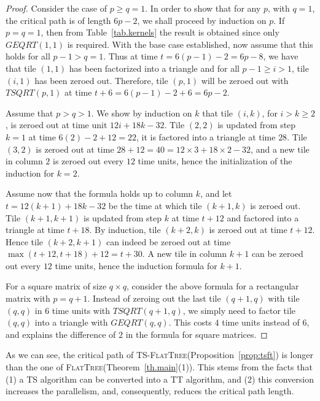 \documentclass[a4paper,twopages]{article}
\newcommand{\GEQRT}{\ensuremath{\mathit{GEQRT}}\xspace}
\newcommand{\TSQRT}{\ensuremath{\mathit{TSQRT}}\xspace}
\newcommand{\TSFT}{\textsc{TS-FlatTree}\xspace}
\newcommand{\FT}{\textsc{FlatTree}\xspace}
\begin{document}
\begin{proof}
    Consider the case of $p \geq q = 1$. In order to show that for any $p$,
    with $q=1$, the critical path is of length $6p-2$, we shall proceed by
    induction on $p$.  If $p=q=1$, then from Table~\ref{tab.kernels} the result
    is obtained since only $\GEQRT(1,1)$ is required.  With the base case
    established, now assume that this holds for all $p-1 > q = 1$.  Thus at
    time $t=6(p-1) -2 = 6p - 8$, we have that tile $(1,1)$ has been factorized
    into a triangle and for all $p-1 \geq i > 1$, tile $(i,1)$ has been zeroed
    out.  Therefore, tile $(p,1)$ will be zeroed out with $\TSQRT(p,1)$ at time
    $t+6 = 6(p-1) - 2 + 6 = 6p-2$.

    Assume that $p>q>1$. We show by induction on $k$ that tile $(i,k)$, for
    $i>k\geq2$, is zeroed out at time unit $12i + 18k - 32$.  Tile $(2,2)$ is
    updated from step $k=1$ at time $6(2) - 2 + 12 = 22$, it is factored into a
    triangle at time $28$. Tile $(3,2)$ is zeroed out at time $28+12=40=12
    \times 3+18 \times 2 - 32$, and a new tile in column $2$ is zeroed out
    every $12$ time units, hence the initialization of the induction for $k=2$.

    Assume now that the formula holds up to column $k$, and let $t=12(k+1) +
    18k - 32$ be the time at which tile $(k+1,k)$ is zeroed out.  Tile
    $(k+1,k+1)$ is updated from step $k$ at time $t+12$ and factored into a
    triangle at time $t+18$. By induction, tile $(k+2,k)$ is zeroed out at time
    $t+12$.  Hence tile $(k+2,k+1)$ can indeed be zeroed out at time
    $\max(t+12,t+18)+12=t+30$. A new tile in column $k+1$ can be zeroed out
    every $12$ time units, hence the induction formula for $k+1$.

    For a square matrix of size $q \times q$, consider the above formula for a
    rectangular matrix with $p=q+1$. Instead of zeroing out the last tile
    $(q+1,q)$ with tile $(q,q)$ in $6$ time units with $\TSQRT(q+1,q)$, we
    simply need to factor tile $(q,q)$ into a triangle with $\GEQRT(q,q)$. This
    costs $4$ time units instead of $6$, and explains the difference of $2$ in
    the formula for square matrices.
\end{proof}

As we can see, the critical path of \TSFT (Proposition~\ref{prop:tsft})
is longer than the one of \FT (Theorem~\ref{th.main}(1)).
This stems from the facts that (1) a TS algorithm can be converted into a TT algorithm, and (2)
this conversion increases the parallelism, and, consequently, reduces the critical path length.
\end{document}
